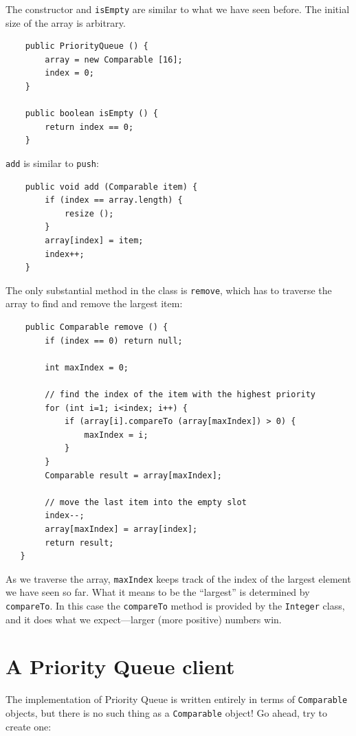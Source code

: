 \documentclass[12pt]{book}
\theoremstyle{exercise}
\begin{document}

The constructor and {\tt isEmpty} are similar to what we have seen
before.  The initial size of the array is arbitrary.

\begin{verbatim}
    public PriorityQueue () {
        array = new Comparable [16];
        index = 0;
    }

    public boolean isEmpty () {
        return index == 0;
    }
\end{verbatim}
%
{\tt add} is similar to {\tt push}:

\begin{verbatim}
    public void add (Comparable item) {
        if (index == array.length) {
            resize ();
        }
        array[index] = item;
        index++;
    }
\end{verbatim}
%
The only substantial method in the class is {\tt remove}, which has
to traverse the array to find and remove the largest item:

\begin{verbatim}
    public Comparable remove () {
        if (index == 0) return null;

        int maxIndex = 0;

        // find the index of the item with the highest priority
        for (int i=1; i<index; i++) {
            if (array[i].compareTo (array[maxIndex]) > 0) {
                maxIndex = i;
            }
        }
        Comparable result = array[maxIndex];

        // move the last item into the empty slot
        index--;
        array[maxIndex] = array[index];
        return result;
   }
\end{verbatim}
%
As we traverse the array, {\tt maxIndex} keeps track of the
index of the largest element we have seen so far.  What it
means to be the ``largest'' is determined by {\tt compareTo}.
In this case the {\tt compareTo} method is provided by the
{\tt Integer} class, and it does what we expect---larger
(more positive) numbers win.


\section {A Priority Queue client}

The implementation of Priority Queue is written entirely
in terms of {\tt Comparable} objects, but there is no
such thing as a {\tt Comparable} object!  Go ahead, try
to create one:
\end{document}

